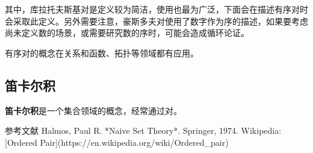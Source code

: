 其中，库拉托夫斯基对是定义较为简洁，使用也最为广泛，下面会在描述有序对时会采取此定义。另外需要注意，豪斯多夫对使用了数字作为序的描述，如果要考虑尚未定义数的场景，或需要研究数的序时，可能会造成循环论证。

有序对的概念在关系和函数、拓扑等领域都有应用。


\subsection{笛卡尔积}

\textbf{笛卡尔积}是一个集合领域的概念，经常通过对。

参考文献
Halmos, Paul R. *Naive Set Theory*. Springer, 1974.
Wikipedia: [Ordered Pair](https://en.wikipedia.org/wiki/Ordered_pair)